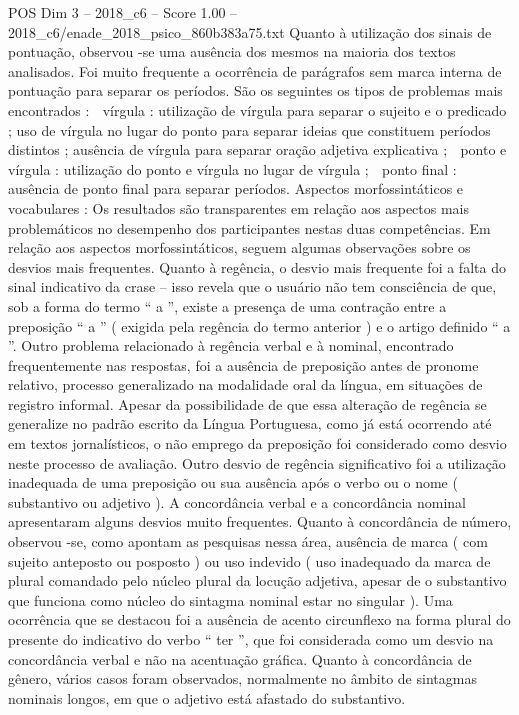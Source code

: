 \begin{textsample}{POS Dim 3 – 2018\_c6 – Score 1.00 – 2018\_c6/enade\_2018\_psico\_860b383a75.txt}
Quanto à utilização dos sinais de pontuação, observou -se uma ausência dos mesmos na maioria dos textos analisados.
Foi muito frequente a ocorrência de parágrafos sem marca interna de pontuação para separar os períodos.
São os seguintes os tipos de problemas mais encontrados :  vírgula : utilização de vírgula para separar o sujeito e o predicado ; uso de vírgula no lugar do ponto para separar ideias que constituem períodos distintos ; ausência de vírgula para separar oração adjetiva explicativa ;  ponto e vírgula : utilização do ponto e vírgula no lugar de vírgula ;  ponto final : ausência de ponto final para separar períodos.
Aspectos morfossintáticos e vocabulares : Os resultados são transparentes em relação aos aspectos mais problemáticos no desempenho dos participantes nestas duas competências.
Em relação aos aspectos morfossintáticos, seguem algumas observações sobre os desvios mais frequentes.
Quanto à regência, o desvio mais frequente foi a falta do sinal indicativo da crase – isso revela que o usuário não tem consciência de que, sob a forma do termo “ a ”, existe a presença de uma contração entre a preposição “ a ” ( exigida pela regência do termo anterior ) e o artigo definido “ a ”.
Outro problema relacionado à regência verbal e à nominal, encontrado frequentemente nas respostas, foi a ausência de preposição antes de pronome relativo, processo generalizado na modalidade oral da língua, em situações de registro informal.
Apesar da possibilidade de que essa alteração de regência se generalize no padrão escrito da Língua Portuguesa, como já está ocorrendo até em textos jornalísticos, o não emprego da preposição foi considerado como desvio neste processo de avaliação.
Outro desvio de regência significativo foi a utilização inadequada de uma preposição ou sua ausência após o verbo ou o nome ( substantivo ou adjetivo ).
A concordância verbal e a concordância nominal apresentaram alguns desvios muito frequentes.
Quanto à concordância de número, observou -se, como apontam as pesquisas nessa área, ausência de marca ( com sujeito anteposto ou posposto ) ou uso indevido ( uso inadequado da marca de plural comandado pelo núcleo plural da locução adjetiva, apesar de o substantivo que funciona como núcleo do sintagma nominal estar no singular ).
Uma ocorrência que se destacou foi a ausência de acento circunflexo na forma plural do presente do indicativo do verbo “ ter ”, que foi considerada como um desvio na concordância verbal e não na acentuação gráfica.
Quanto à concordância de gênero, vários casos foram observados, normalmente no âmbito de sintagmas nominais longos, em que o adjetivo está afastado do substantivo.

\end{textsample}
